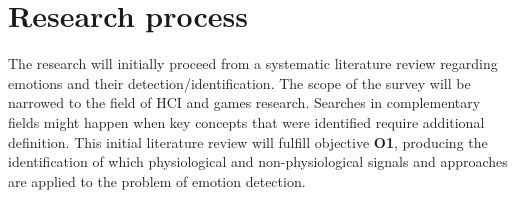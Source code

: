 

\section{Research process}
\label{sec:research-process}

The research will initially proceed from a systematic literature review regarding emotions and their detection/identification. The scope of the survey will be narrowed to the field of HCI and games research. Searches in complementary fields might happen when key concepts that were identified require additional definition. This initial literature review will fulfill objective \textbf{O1}, producing the identification of which physiological and non-physiological signals and approaches are applied to the problem of emotion detection.

